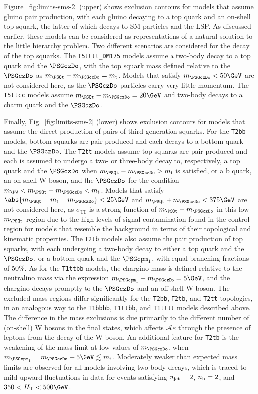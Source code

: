 Figure~\ref{fig:limits-sms-2} (upper) shows exclusion contours for
models that assume gluino pair production, with each gluino decaying
to a top quark and an on-shell top squark, the latter of which decays
to SM particles and the LSP. As discussed earlier, these
models can be considered as representations of a natural solution
to the little hierarchy problem. Two different scenarios are
considered for the decay of the top squarks. The
\texttt{T5tttt\_DM175} models assume a two-body decay to a top quark
and the $\PSGczDo$, with the top squark mass defined relative to the
$\PSGczDo$ as $m_{\PSQt} - m_{\PSGczDo} = m_\text{t}$. Models that
satisfy $m_{\PSGczDo} < 50\GeV$ are not considered here, as the
$\PSGczDo$ particles carry very little momentum.  The \texttt{T5ttcc}
models assume $m_{\PSQt} - m_{\PSGczDo} = 20\GeV$ and two-body decays
to a charm quark and the $\PSGczDo$.

Finally, Fig.~\ref{fig:limits-sms-2} (lower) shows exclusion contours
for models that assume the direct production of pairs of
third-generation squarks. For the \texttt{T2bb} models, bottom squarks
are pair produced and each decays to a bottom quark and the
$\PSGczDo$. The \texttt{T2tt} models assume top squarks are pair
produced and each is assumed to undergo a two- or three-body decay to,
respectively, a top quark and the $\PSGczDo$ when $m_{\PSQt} -
m_{\PSGczDo} > m_\text{t}$ is satisfied, or a b quark, an on-shell W
boson, and the $\PSGczDo$ for the condition $m_{\PW} < m_{\PSQt} -
m_{\PSGczDo} < m_\text{t}$. Models that satisfy $\abs{m_{\PSQt} -
  m_\text{t} - m_{\PSGczDo}} < 25\GeV$ and $m_{\PSQt} + m_{\PSGczDo} <
375\GeV$ are not considered here, as $\sigma_\text{UL}$ is a strong
function of $m_{\PSQt} - m_{\PSGczDo}$ in this low-$m_{\PSQt}$ region
due to the high levels of signal contamination found in the \mj
control region for models that resemble the \ttbar background in terms
of their topological and kinematic properties. The \texttt{T2tb}
models also assume the pair production of top squarks, with each
undergoing a two-body decay to either a top quark and the $\PSGczDo$,
or a bottom quark and the $\PSGcpm_1$, with equal branching fractions
of 50\%. As for the \texttt{T1ttbb} models, the chargino mass is
defined relative to the neutralino mass via the expression
$m_{\PSGcpm_1} - m_{\PSGczDo} = 5\GeV$, and the chargino decays promptly
to the $\PSGczDo$ and an off-shell W boson. The excluded mass regions
differ significantly for the \texttt{T2bb}, \texttt{T2tb}, and
\texttt{T2tt} topologies, in an analogous way to the \texttt{T1bbbb},
\texttt{T1ttbb}, and \texttt{T1tttt} models described above. The
difference in the mass exclusions is due primarily to the different
number of (on-shell) W bosons in the final states, which affects
$\mathcal{A} \, \varepsilon$ through the presence of leptons from
the decay of the W boson. An additional feature for \texttt{T2tb} is
the weakening of the mass limit at low values of $m_{\PSGczDo}$, when
$m_{\PSGcpm_1} = m_{\PSGczDo} + 5\GeV \lesssim m_\text{t}$. Moderately
weaker than expected mass limits are observed for all models involving
two-body decays, which is traced to mild upward fluctuations in data
for events satisfying $n_{\text{jet}} = 2$, $n_{\text{b}} = 2$, and $350 < \scalht <
500\GeV$.

